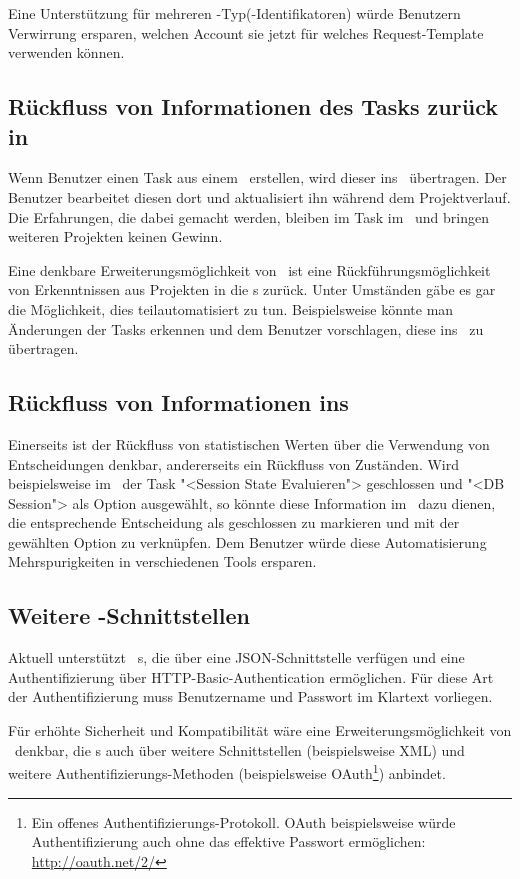 			Eine Unterstützung für mehreren \ppt-Typ(-Identifikatoren) würde Benutzern Verwirrung ersparen,
			welchen Account sie jetzt für welches Request-Template verwenden können.
			
			
		\subsection{Rückfluss von Informationen des Tasks zurück in \ttpl}
		\label{subsec:informationFlowbackFeature}
			Wenn Benutzer einen Task aus einem \ttpl\ erstellen, wird dieser ins \ppt\ übertragen.
			Der Benutzer bearbeitet diesen dort und aktualisiert ihn während dem Projektverlauf.
			Die Erfahrungen, die dabei gemacht werden, bleiben im Task im \ppt\
			und bringen weiteren Projekten keinen Gewinn.
			
			Eine denkbare Erweiterungsmöglichkeit von \eeppi\ ist eine Rückführungsmöglichkeit von
			Erkenntnissen aus Projekten in die \ttpl s zurück.
			Unter Umständen gäbe es gar die Möglichkeit, dies teilautomatisiert zu tun.
			Beispielsweise könnte man Änderungen der Tasks erkennen und dem Benutzer vorschlagen, diese ins \eeppi\ zu übertragen.
			
			
		\subsection{Rückfluss von Informationen ins \dks}
		\label{subsec:informationFlowbackFeatureDKS}
			Einerseits ist der Rückfluss von statistischen Werten über die Verwendung von Entscheidungen denkbar, 
			andererseits ein Rückfluss von Zuständen.
			Wird beispielsweise im \ppt\ der Task "<Session State Evaluieren"> geschlossen und "<DB Session"> als Option ausgewählt, 
			so könnte diese Information im \dks\ dazu dienen, 
			die entsprechende Entscheidung als geschlossen zu markieren und mit der gewählten Option zu verknüpfen.
			Dem Benutzer würde diese Automatisierung Mehrspurigkeiten in verschiedenen Tools ersparen.


		\subsection{Weitere \ppt-Schnittstellen}
		\label{subsec:morePPTInterfaces}
			Aktuell unterstützt \eeppi\ \ppt s, die über eine JSON-Schnittstelle verfügen
			und eine Authentifizierung über HTTP-Basic-Authentication ermöglichen.
			Für diese Art der Authentifizierung muss Benutzername und Passwort im Klartext vorliegen.
			
			Für erhöhte Sicherheit und Kompatibilität wäre eine Erweiterungsmöglichkeit von \eeppi\ denkbar,
			die \ppt s auch über weitere Schnittstellen (beispielsweise XML)
			und weitere Authentifizierungs-Methoden (beispielsweise OAuth\footnote{Ein offenes Authentifizierungs-Protokoll. OAuth beispielsweise würde Authentifizierung auch ohne das effektive Passwort ermöglichen: \url{http://oauth.net/2/}}) anbindet.
			

